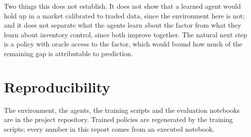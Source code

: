 \documentclass[10pt,twocolumn]{article}
\begin{document}
Two things this does not establish. It does not show that a learned agent would hold up in a market calibrated to
traded data, since the environment here is not; and it does not separate what the agents learn about the factor
from what they learn about inventory control, since both improve together. The natural next step is a policy with
oracle access to the factor, which would bound how much of the remaining gap is attributable to prediction.

\section*{Reproducibility}

The environment, the agents, the training scripts and the evaluation notebooks are in the project repository.
Trained policies are regenerated by the training scripts; every number in this report comes from an executed
notebook.
\end{document}
